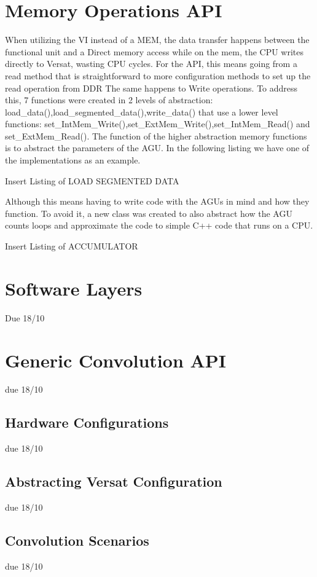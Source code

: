 \section{Memory Operations API}

When utilizing the VI instead of a MEM, the data transfer happens between the functional unit and a Direct memory access while
on the mem, the CPU writes directly to Versat, wasting CPU cycles. For the API, this means going from a read method that is straightforward
to more configuration methods to set up the read operation from DDR The same happens to Write operations. To address this, 7 functions were created in 2 levels of abstraction:
load\_data(),load\_segmented\_data(),write\_data() that use a lower level functions: set\_IntMem\_Write(),set\_ExtMem\_Write(),set\_IntMem\_Read() and set\_ExtMem\_Read().
The function of the higher abstraction memory functions is to abstract the parameters of the AGU. In the following listing we have one of the implementations
as an example.

Insert Listing of LOAD SEGMENTED DATA

Although this means having to write code with the AGUs in mind
and how they function. To avoid it, a new class was created to also abstract how the AGU counts loops and approximate 
the code to simple C++ code that runs on a CPU.

Insert Listing of ACCUMULATOR


\subsection{}


\section{Software Layers}


Due 18/10

\section{Generic Convolution API}

due 18/10

\subsection{Hardware Configurations}

due 18/10

\subsection{Abstracting Versat Configuration}

due 18/10

\subsection{Convolution Scenarios}

due 18/10





